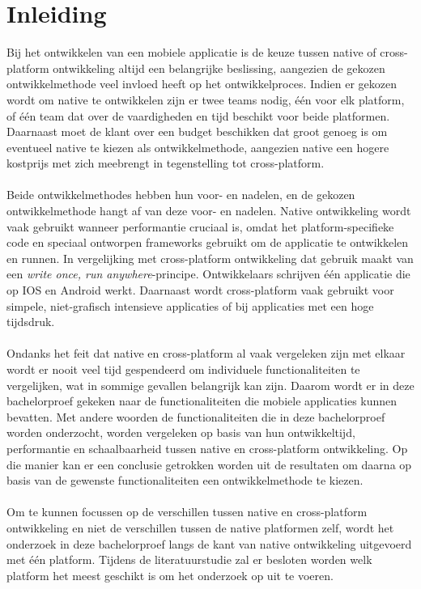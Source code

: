 
\chapter{Inleiding}
\label{ch:inleiding}

Bij het ontwikkelen van een mobiele applicatie is de keuze tussen native of cross-platform ontwikkeling altijd een belangrijke beslissing,
aangezien de gekozen ontwikkelmethode veel invloed heeft op het ontwikkelproces. 
Indien er gekozen wordt om native te ontwikkelen zijn er twee teams nodig, één voor elk platform, of één team dat over de vaardigheden 
en tijd beschikt voor beide platformen. 
Daarnaast moet de klant over een budget beschikken dat groot genoeg is om eventueel native te kiezen als ontwikkelmethode, 
aangezien native een hogere kostprijs met zich meebrengt in tegenstelling tot cross-platform.
\\\\
Beide ontwikkelmethodes hebben hun voor- en nadelen, en de gekozen ontwikkelmethode hangt af van deze voor- en nadelen. 
Native ontwikkeling wordt vaak gebruikt wanneer performantie cruciaal is, 
omdat het platform-specifieke code en speciaal ontworpen frameworks gebruikt om de applicatie te ontwikkelen en runnen. 
In vergelijking met cross-platform ontwikkeling dat gebruik maakt van een \textit{write once, run anywhere}-principe. 
Ontwikkelaars schrijven één applicatie die op IOS en Android werkt. 
Daarnaast wordt cross-platform vaak gebruikt voor simpele, niet-grafisch intensieve applicaties of bij applicaties met een hoge tijdsdruk.
\\\\
Ondanks het feit dat native en cross-platform al vaak vergeleken zijn met elkaar wordt er nooit veel tijd gespendeerd om 
individuele functionaliteiten te vergelijken, wat in sommige gevallen belangrijk kan zijn.
Daarom wordt er in deze bachelorproef gekeken naar de functionaliteiten 
die mobiele applicaties kunnen bevatten. Met andere woorden de functionaliteiten die in deze bachelorproef worden onderzocht,
worden vergeleken op basis van hun ontwikkeltijd, performantie en schaalbaarheid tussen native en cross-platform ontwikkeling.
Op die manier kan er een conclusie getrokken worden uit de resultaten om daarna op basis van de gewenste functionaliteiten een ontwikkelmethode te kiezen.
\\\\
Om te kunnen focussen op de verschillen tussen native en cross-platform ontwikkeling en niet de verschillen tussen de native platformen zelf,
wordt het onderzoek in deze bachelorproef langs de kant van native ontwikkeling uitgevoerd met één platform. 
Tijdens de literatuurstudie zal er besloten worden welk platform het meest geschikt is om het onderzoek op uit te voeren. 


